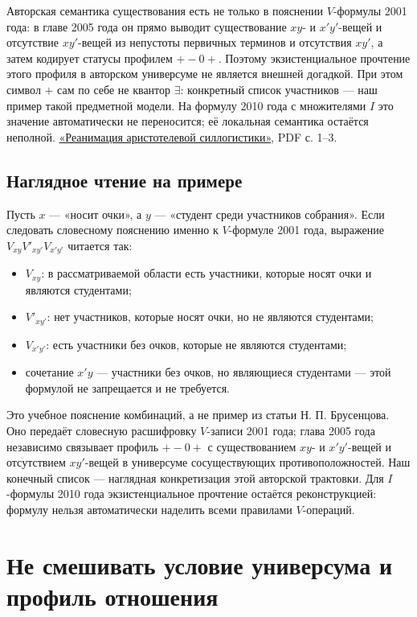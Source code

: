 \documentclass[12pt,a4paper]{article}
\begin{document}
Авторская семантика существования есть не только в пояснении $V$-формулы 2001 года: в главе 2005 года он прямо выводит существование $xy$- и $x'y'$-вещей и отсутствие $xy'$-вещей из непустоты первичных терминов и отсутствия $xy'$, а затем кодирует статусы профилем $+-0+$. Поэтому экзистенциальное прочтение этого профиля в авторском универсуме не является внешней догадкой. При этом символ $+$ сам по себе не квантор $\exists$: конкретный список участников — наш пример такой предметной модели. На формулу 2010 года с множителями $I$ это значение автоматически не переносится; её локальная семантика остаётся неполной. \href{https://ternarycomp.cs.msu.ru/Papers/Rea.pdf}{«Реанимация аристотелевой силлогистики»}, PDF с. 1–3.

\subsection{Наглядное чтение на примере}

Пусть $x$ — «носит очки», а $y$ — «студент среди участников собрания». Если следовать словесному пояснению именно к $V$-формуле 2001 года, выражение $V_{xy} V'_{xy'} V_{x'y'}$ читается так:

\begin{itemize}
\item $V_{xy}$: в рассматриваемой области есть участники, которые носят очки и являются студентами;
\item $V'_{xy'}$: нет участников, которые носят очки, но не являются студентами;
\item $V_{x'y'}$: есть участники без очков, которые не являются студентами;
\item сочетание $x'y$ — участники без очков, но являющиеся студентами — этой формулой не запрещается и не требуется.
\end{itemize}

Это учебное пояснение комбинаций, а не пример из статьи Н. П. Брусенцова. Оно передаёт словесную расшифровку $V$-записи 2001 года; глава 2005 года независимо связывает профиль $+-0+$ с существованием $xy$- и $x'y'$-вещей и отсутствием $xy'$-вещей в универсуме сосуществующих противоположностей. Наш конечный список — наглядная конкретизация этой авторской трактовки. Для $I$-формулы 2010 года экзистенциальное прочтение остаётся реконструкцией: формулу нельзя автоматически наделить всеми правилами $V$-операций.

\section{Не смешивать условие универсума и профиль отношения}
\end{document}
